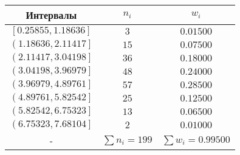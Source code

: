 %
\normalsize%
\begin{longtabu}spread 0pt{ | c | c | c | }%
\hline%
Интервалы&$n_i$&$w_i$\\%
\hline%
$\left[0.25855,1.18636\right]$&$3$&$0.01500$\\%
\hline%
$\left(1.18636,2.11417\right]$&$15$&$0.07500$\\%
\hline%
$\left(2.11417,3.04198\right]$&$36$&$0.18000$\\%
\hline%
$\left(3.04198,3.96979\right]$&$48$&$0.24000$\\%
\hline%
$\left(3.96979,4.89761\right]$&$57$&$0.28500$\\%
\hline%
$\left(4.89761,5.82542\right]$&$25$&$0.12500$\\%
\hline%
$\left(5.82542,6.75323\right]$&$13$&$0.06500$\\%
\hline%
$\left(6.75323,7.68104\right]$&$2$&$0.01000$\\%
\hline%
{-}&$\sum\limits n_i = 199$&$\sum\limits w_i = 0.99500$\\%
\hline%
\end{longtabu}%
%